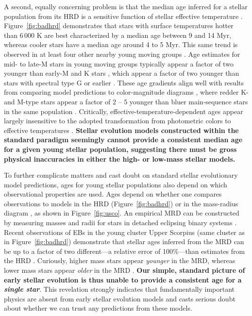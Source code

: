 A second, equally concerning problem is that the median age inferred for a stellar population from its HRD is a sensitive function of stellar effective temperature \citep{Hillenbrand1997, Herczeg2015}. Figure~\ref{fig:badhrd} demonstrates that stars with surface temperatures hotter than 6\,000 K are best characterized by a median age between 9 and 14 Myr, whereas cooler stars have a median age around 4 to 5 Myr. This same trend is observed in at least four other nearby young moving groups \citep{Herczeg2015}. Age estimates for mid- to late-M stars in young moving groups typically appear a factor of two younger than early-M and K stars \citep{Malo2014, Herczeg2015}, which appear a factor of two younger than stars with spectral type G or earlier \citep{Hillenbrand2008}. These age gradients align well with results from comparing model predictions to color-magnitude diagrams \citep{Naylor2009}, where redder K- and M-type stars appear a factor of 2 -- 5 younger than bluer main-sequence stars in the same population \citep{Naylor2009, Bell2012}. Critically, effective-temperature-dependent ages appear largely insensitive to the adopted transformation from photometric colors to effective temperatures \citep[a so-called ``color-$T_{\rm eff}$ transformation'';][]{Herczeg2015}. {\bf Stellar evolution models constructed within the standard paradigm seemingly cannot provide a consistent median age for a given young stellar population, suggesting there must be gross physical inaccuracies in either the high- or low-mass stellar models.}

To further complicate matters and cast doubt on standard stellar evolutionary model predictions, ages for young stellar populations also depend on which observational properties are used. Ages depend on whether one compares observations to models in the HRD (Figure~\ref{fig:badhrd}) or in the mass-radius diagram \citep[MRD;][]{Kraus2015}, as shown in Figure~\ref{fig:usco}. An empirical MRD can be constructed by measuring masses and radii for stars in detached eclipsing binary systems \citep[EBs;][]{Andersen1991, Torres2010}. Recent observations of EBs in the young cluster Upper Scorpius (same cluster as in Figure~\ref{fig:badhrd}) demonstrate that stellar ages inferred from the MRD can be up to a factor of two different---a relative error of 100\%---than estimates from the HRD \citep[see Figure~\ref{fig:usco};][]{Kraus2015, Alonso2015, David2016}. Curiously, higher mass stars appear {\it younger} in the MRD, whereas lower mass stars appear {\it older} in the MRD \citep{Feiden2016}. {\bf Our simple, standard picture of early stellar evolution is thus unable to provide a consistent age for a \emph{single star}}. This revelation strongly indicates that fundamentally important physics are absent from early stellar evolution models and casts serious doubt about whether we can trust any predictions from these models. 

